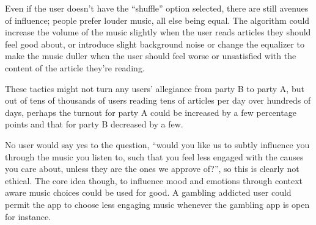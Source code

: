 \documentclass{article}
\begin{document}
    Even if the user doesn’t have the “shuffle” option selected, there are still avenues of influence; people prefer louder music, all else being equal. The algorithm could increase the volume of the music slightly when the user reads articles they should feel good about, or introduce slight background noise or change the equalizer to make the music duller when the user should feel worse or unsatisfied with the content of the article they’re reading. 
    
    These tactics might not turn any users’ allegiance from party B to party A, but out of tens of thousands of users reading tens of articles per day over hundreds of days, perhaps the turnout for party A could be increased by a few percentage points and that for party B decreased by a few. 
    
    No user would say yes to the question, “would you like us to subtly influence you through the music you listen to, such that you feel less engaged with the causes you care about, unless they are the ones we approve of?”, so this is clearly not ethical. The core idea though, to influence mood and emotions through context aware music choices could be used for good. A gambling addicted user could permit the app to choose less engaging music whenever the gambling app is open for instance.













\newpage

\end{document}
